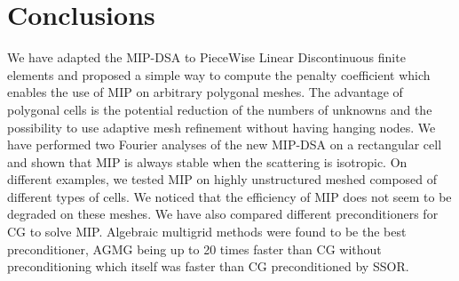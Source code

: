\section{Conclusions} \label{sec_conc}
We have adapted the MIP-DSA to PieceWise Linear Discontinuous finite elements
and proposed a simple way to compute the penalty coefficient which enables the
use of MIP on arbitrary polygonal meshes. The advantage of polygonal cells 
is the potential reduction 
of the numbers of unknowns and the possibility to use adaptive mesh refinement 
without having hanging nodes. We have performed two Fourier analyses of the
new MIP-DSA on a rectangular cell and shown that MIP is always stable when the
scattering is isotropic. On different examples, we tested MIP on highly
unstructured meshed composed of different types of cells. We noticed that the
efficiency of MIP does not seem to be degraded on these meshes. We have also
compared different preconditioners for CG to solve MIP. Algebraic multigrid
methods were found to be the best preconditioner, AGMG being up to 20 times
faster than CG without preconditioning which itself was faster than CG
preconditioned by SSOR.

